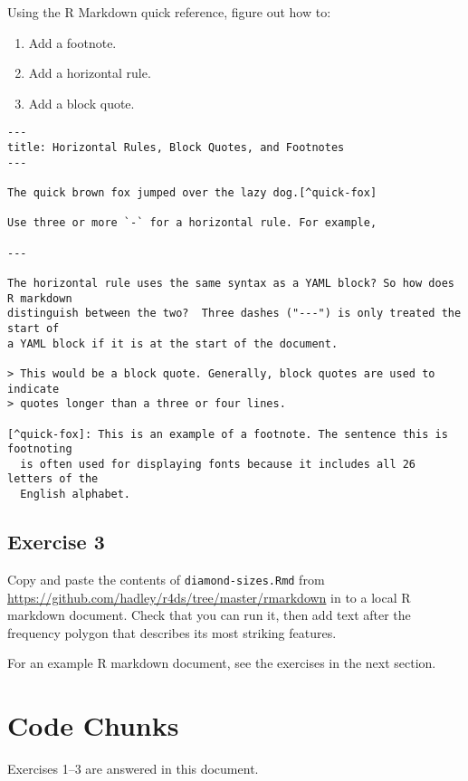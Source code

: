 \documentclass[]{book}
\providecommand{\tightlist}{%
  \setlength{\itemsep}{0pt}\setlength{\parskip}{0pt}}
\theoremstyle{plain}
\theoremstyle{remark}
\theoremstyle{definition}
\theoremstyle{definition}
\theoremstyle{definition}
\theoremstyle{remark}
\begin{document}
Using the R Markdown quick reference, figure out how to:

\begin{enumerate}
\def\labelenumi{\arabic{enumi}.}
\tightlist
\item
  Add a footnote.
\item
  Add a horizontal rule.
\item
  Add a block quote.
\end{enumerate}

\begin{verbatim}
---
title: Horizontal Rules, Block Quotes, and Footnotes
---

The quick brown fox jumped over the lazy dog.[^quick-fox]

Use three or more `-` for a horizontal rule. For example,

---

The horizontal rule uses the same syntax as a YAML block? So how does R markdown
distinguish between the two?  Three dashes ("---") is only treated the start of
a YAML block if it is at the start of the document.

> This would be a block quote. Generally, block quotes are used to indicate
> quotes longer than a three or four lines.

[^quick-fox]: This is an example of a footnote. The sentence this is footnoting
  is often used for displaying fonts because it includes all 26 letters of the
  English alphabet.
\end{verbatim}

\hypertarget{exercise-3-55}{%
\subsection{Exercise 3}\label{exercise-3-55}}

Copy and paste the contents of \texttt{diamond-sizes.Rmd} from
\url{https://github.com/hadley/r4ds/tree/master/rmarkdown} in to a local
R markdown document. Check that you can run it, then add text after the
frequency polygon that describes its most striking features.

For an example R markdown document, see the exercises in the next
section.

\hypertarget{code-chunks}{%
\section{Code Chunks}\label{code-chunks}}

Exercises 1--3 are answered in this document.
\end{document}
